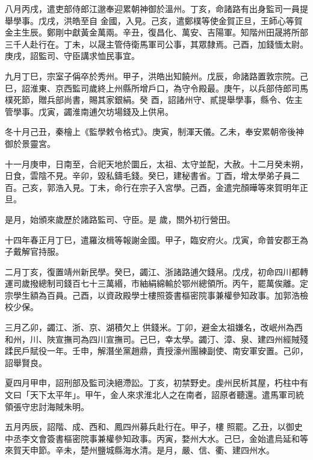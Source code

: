 \begin{pinyinscope}
 八月丙戌，遣吏部侍郎江邈奉迎累朝神御於溫州。丁亥，命諸路有出身監司一員提舉學事。戊戌，洪皓至自
 金國，入見。己亥，遣鄭樸等使金賀正旦，王師心等賀金主生辰。鄭剛中獻黃金萬兩。辛丑，復昌化、萬安、吉陽軍。知階州田晟將所部三千人赴行在。丁未，以晟主管侍衛馬軍司公事，其眾隸焉。己酉，加錢愐太尉。庚戌，詔監司、守臣講求恤民事宜。



 九月丁巳，宗室子偁卒於秀州。甲子，洪皓出知饒州。戊辰，命諸路置敦宗院。己巳，詔淮東、京西監司歲終上州縣所增戶口，為守令殿最。庚午，以兵部侍郎司馬樸死節，贈兵部尚書，賜其家銀絹。癸
 酉，詔諸州守、貳提舉學事，縣令、佐主管學事。戊寅，蠲淮南逋欠坊場錢及上供帛。



 冬十月己丑，秦檜上《監學敕令格式》。庚寅，制渾天儀。乙未，奉安累朝帝後神御於景靈宮。



 十一月庚申，日南至，合祀天地於圜丘，太祖、太守並配，大赦。十二月癸未朔，日食，雲陰不見。辛卯，毀私鑄毛錢。癸巳，建秘書省。丁酉，增太學弟子員二百。己亥，郭浩入見。丁未，命行在宗子入宮學。己酉，金遣完顏曄等來賀明年正旦。



 是月，始頒來歲歷於諸路監司、守臣。是
 歲，關外初行營田。



 十四年春正月丁巳，遣羅汝楫等報謝金國。甲子，臨安府火。戊寅，命普安郡王為子戴解官持服。



 二月丁亥，復置靖州新民學。癸巳，蠲江、浙諸路逋欠錢帛。戊戌，初命四川都轉運司歲撥總制司錢百七十三萬緡，市紬絹綿輸於鄂州總領所。丙午，罷萬俟離。定宗學生額為百員。己酉，以資政殿學士樓照簽書樞密院事兼權參知政事。加郭浩檢校少保。



 三月乙卯，蠲江、浙、京、湖積欠上
 供錢米。丁卯，避金太祖嫌名，改岷州為西和州，川、陜宣撫司為四川宣撫司。己巳，幸太學。蠲汀、漳、泉、建四州經賊殘蹂民戶賦役一年。壬申，解潛坐黨趙鼎，責授濠州團練副使、南安軍安置。己卯，詔舉賢良。



 夏四月甲申，詔刑部及監司決絕滯訟。丁亥，初禁野史。虔州民析其屋，朽柱中有文曰「天下太平年」。甲午，金人來求淮北人之在南者，詔原者聽還。遣馬軍司統領張守忠討海賊朱明。



 五月丙辰，詔階、成、西和、鳳四州募兵赴行在。甲子，樓
 照罷。乙丑，以御史中丞李文會簽書樞密院事兼權參知政事。丙寅，婺州大水。己巳，金始遣烏延和等來賀天申節。辛未，楚州鹽城縣海水清。是月，嚴、信、衢、建四州水。




\end{pinyinscope}
